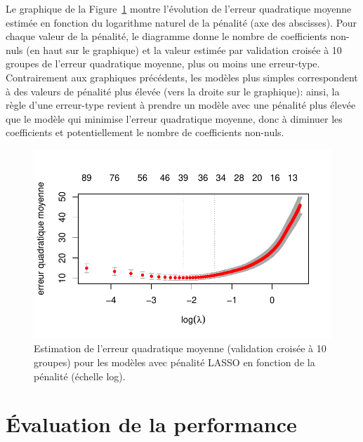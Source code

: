 \documentclass[
  11pt,
  letterpaper,
]{scrbook}
\theoremstyle{definition}
\theoremstyle{remark}
\begin{document}
Le graphique de la Figure~\ref{fig-lassopath} montre l'évolution de
l'erreur quadratique moyenne estimée en fonction du logarithme naturel
de la pénalité (axe des abscisses). Pour chaque valeur de la pénalité,
le diagramme donne le nombre de coefficients non-nuls (en haut sur le
graphique) et la valeur estimée par validation croisée à 10 groupes de
l'erreur quadratique moyenne, plus ou moins une erreur-type.
Contrairement aux graphiques précédents, les modèles plus simples
correspondent à des valeurs de pénalité plus élevée (vers la droite sur
le graphique): ainsi, la règle d'une erreur-type revient à prendre un
modèle avec une pénalité plus élevée que le modèle qui minimise l'erreur
quadratique moyenne, donc à diminuer les coefficients et potentiellement
le nombre de coefficients non-nuls.

\begin{figure}[ht!]

{\centering \includegraphics[width=1\textwidth,height=\textheight]{selectionmodeles_files/figure-pdf/fig-lassopath-1.pdf}

}

\caption{\label{fig-lassopath}Estimation de l'erreur quadratique moyenne
(validation croisée à 10 groupes) pour les modèles avec pénalité LASSO
en fonction de la pénalité (échelle log).}

\end{figure}

\hypertarget{uxe9valuation-de-la-performance}{%
\section{Évaluation de la
performance}\label{uxe9valuation-de-la-performance}}
\end{document}
